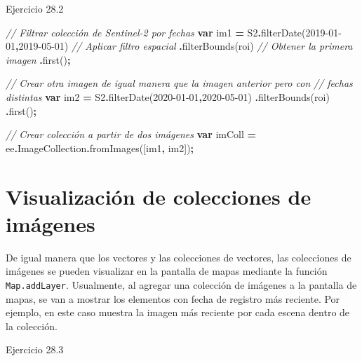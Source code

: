\documentclass[
  12pt,
  letterpaper,
  twoside]{book}
\newenvironment{Shaded}{\begin{snugshade}}{\end{snugshade}}
\newcommand{\AttributeTok}[1]{\textcolor[rgb]{0.77,0.63,0.00}{#1}}
\newcommand{\CommentTok}[1]{\textcolor[rgb]{0.56,0.35,0.01}{\textit{#1}}}
\newcommand{\FunctionTok}[1]{\textcolor[rgb]{0.00,0.00,0.00}{#1}}
\newcommand{\KeywordTok}[1]{\textcolor[rgb]{0.13,0.29,0.53}{\textbf{#1}}}
\newcommand{\NormalTok}[1]{#1}
\newcommand{\OperatorTok}[1]{\textcolor[rgb]{0.81,0.36,0.00}{\textbf{#1}}}
\newcommand{\StringTok}[1]{\textcolor[rgb]{0.31,0.60,0.02}{#1}}
\begin{document}
Ejercicio 28.2

\begin{Shaded}
\begin{Highlighting}[]
\CommentTok{// Filtrar colección de Sentinel{-}2 por fechas}
\KeywordTok{var}\NormalTok{ im1 }\OperatorTok{=}\NormalTok{ S2}\OperatorTok{.}\FunctionTok{filterDate}\NormalTok{(}\StringTok{\textquotesingle{}2019{-}01{-}01\textquotesingle{}}\OperatorTok{,}\StringTok{\textquotesingle{}2019{-}05{-}01\textquotesingle{}}\NormalTok{)}
  \CommentTok{// Aplicar filtro espacial}
 \OperatorTok{.}\FunctionTok{filterBounds}\NormalTok{(roi)}
 \CommentTok{// Obtener la primera imagen}
 \OperatorTok{.}\FunctionTok{first}\NormalTok{()}\OperatorTok{;}

\CommentTok{// Crear otra imagen de igual manera que la imagen anterior pero con }
\CommentTok{// fechas distintas}
\KeywordTok{var}\NormalTok{ im2 }\OperatorTok{=}\NormalTok{ S2}\OperatorTok{.}\FunctionTok{filterDate}\NormalTok{(}\StringTok{\textquotesingle{}2020{-}01{-}01\textquotesingle{}}\OperatorTok{,}\StringTok{\textquotesingle{}2020{-}05{-}01\textquotesingle{}}\NormalTok{)}
 \OperatorTok{.}\FunctionTok{filterBounds}\NormalTok{(roi)}
 \OperatorTok{.}\FunctionTok{first}\NormalTok{()}\OperatorTok{;}

\CommentTok{// Crear colección a partir de dos imágenes}
\KeywordTok{var}\NormalTok{ imColl }\OperatorTok{=}\NormalTok{ ee}\OperatorTok{.}\AttributeTok{ImageCollection}\OperatorTok{.}\FunctionTok{fromImages}\NormalTok{([im1}\OperatorTok{,}\NormalTok{ im2])}\OperatorTok{;}
\end{Highlighting}
\end{Shaded}

\hypertarget{visualizaciuxf3n-de-colecciones-de-imuxe1genes}{%
\section{Visualización de colecciones de imágenes}\label{visualizaciuxf3n-de-colecciones-de-imuxe1genes}}

De igual manera que los vectores y las colecciones de vectores, las colecciones de imágenes se pueden visualizar en la pantalla de mapas mediante la función \texttt{Map.addLayer}. Usualmente, al agregar una colección de imágenes a la pantalla de mapas, se van a mostrar los elementos con fecha de registro más reciente. Por ejemplo, en este caso muestra la imagen más reciente por cada escena dentro de la colección.

Ejercicio 28.3
\end{document}
